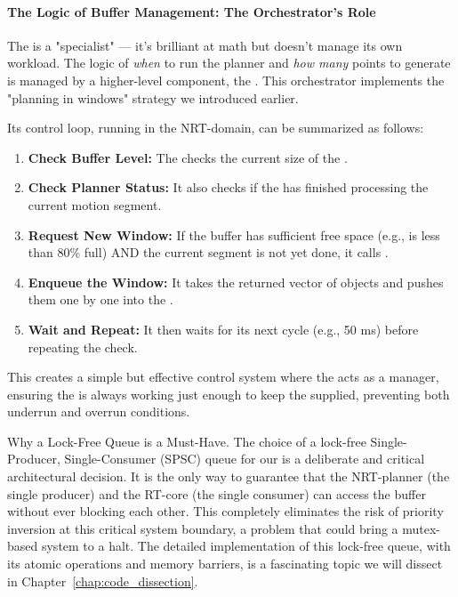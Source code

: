 \paragraph{The Logic of Buffer Management: The Orchestrator's Role}
The  is a "specialist" — it's brilliant at math but doesn't manage its own workload. The logic of \textit{when} to run the planner and \textit{how many} points to generate is managed by a higher-level component, the \textbf{}. This orchestrator implements the "planning in windows" strategy we introduced earlier.

Its control loop, running in the NRT-domain, can be summarized as follows:
\begin{enumerate}
    \item \textbf{Check Buffer Level:} The  checks the current size of the .
    \item \textbf{Check Planner Status:} It also checks if the  has finished processing the current motion segment.
    \item \textbf{Request New Window:} If the buffer has sufficient free space (e.g., is less than 80\% full) AND the current segment is not yet done, it calls .
    \item \textbf{Enqueue the Window:} It takes the returned vector of  objects and pushes them one by one into the .
    \item \textbf{Wait and Repeat:} It then waits for its next cycle (e.g., 50 ms) before repeating the check.
\end{enumerate}
This creates a simple but effective control system where the  acts as a manager, ensuring the  is always working just enough to keep the  supplied, preventing both underrun and overrun conditions.

\begin{tipbox}{Why a Lock-Free Queue is a Must-Have.}
    The choice of a lock-free Single-Producer, Single-Consumer (SPSC) queue for our  is a deliberate and critical architectural decision. It is the only way to guarantee that the NRT-planner (the single producer) and the RT-core (the single consumer) can access the buffer without ever blocking each other. This completely eliminates the risk of priority inversion at this critical system boundary, a problem that could bring a mutex-based system to a halt. The detailed implementation of this lock-free queue, with its atomic operations and memory barriers, is a fascinating topic we will dissect in Chapter~\ref{chap:code_dissection}.
\end{tipbox}

